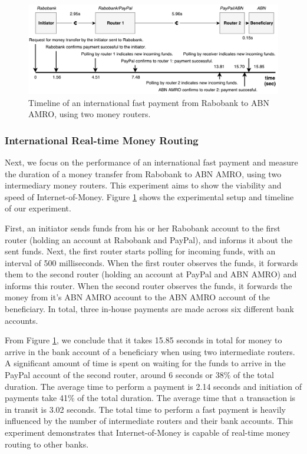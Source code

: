 \begin{figure}[t]
	\centering
	\includegraphics[width=\linewidth]{iom/assets/speedball}
	\caption{Timeline of an international fast payment from Rabobank to ABN AMRO, using two money routers.}
	\label{fig:speedball_experiment}
\end{figure}

\subsubsection*{International Real-time Money Routing}
Next, we focus on the performance of an international fast payment and measure the duration of a money transfer from Rabobank to ABN AMRO, using two intermediary money routers.
This experiment aims to show the viability and speed of Internet-of-Money.
Figure \ref{fig:speedball_experiment} shows the experimental setup and timeline of our experiment.

First, an initiator sends funds from his or her Rabobank account to the first router (holding an account at Rabobank and PayPal), and informs it about the sent funds.
Next, the first router starts polling for incoming funds, with an interval of 500 milliseconds.
When the first router observes the funds, it forwards them to the second router (holding an account at PayPal and ABN AMRO) and informs this router.
When the second router observes the funds, it forwards the money from it's ABN AMRO account to the ABN AMRO account of the beneficiary.
In total, three in-house payments are made across six different bank accounts.

From Figure \ref{fig:speedball_experiment}, we conclude that it takes 15.85 seconds in total for money to arrive in the bank account of a beneficiary when using two intermediate routers.
A significant amount of time is spent on waiting for the funds to arrive in the PayPal account of the second router, around 6 seconds or 38\% of the total duration.
The average time to perform a payment is 2.14 seconds and initiation of payments take 41\% of the total duration.
The average time that a transaction is in transit is 3.02 seconds.
The total time to perform a fast payment is heavily influenced by the number of intermediate routers and their bank accounts.
This experiment demonstrates that Internet-of-Money is capable of real-time money routing to other banks.

